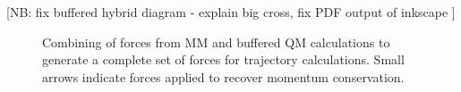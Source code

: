\documentclass[11pt]{revtex4}
\begin{document}
[NB: fix buffered hybrid diagram - explain big cross, fix PDF output of inkscape ]

\begin{figure}
  \centerline{}
  \caption{Combining of forces from MM and buffered QM calculations
           to generate a complete set of forces for trajectory calculations.
           Small arrows indicate forces applied to recover momentum
           conservation.}
  \label{fig:buffered_hybrid_diagram}
\end{figure}
\end{document}
